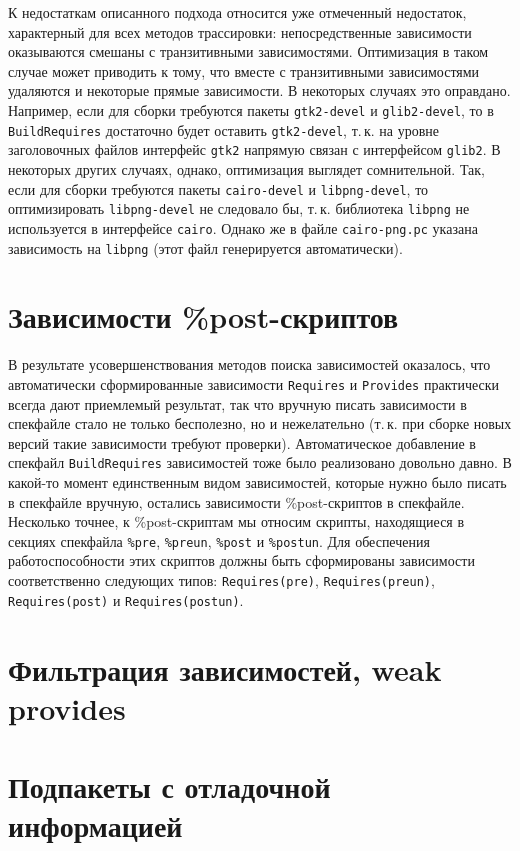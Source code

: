 \documentclass[russian,a4paper,12pt,titlepage]{article}
\begin{document}
К недостаткам описанного подхода относится уже отмеченный недостаток, характерный для всех методов трассировки:
непосредственные зависимости оказываются смешаны с транзитивными зависимостями.  Оптимизация в таком случае
может приводить к тому, что вместе с транзитивными зависимостями удаляются и некоторые прямые зависимости.
В некоторых случаях это оправдано.  Например, если для сборки требуются пакеты \verb|gtk2-devel| и
\verb|glib2-devel|, то в \verb|BuildRequires| достаточно будет оставить \verb|gtk2-devel|, т.\,к. на уровне
заголовочных файлов интерфейс \verb|gtk2| напрямую связан с интерфейсом \verb|glib2|.  В некоторых других случаях,
однако, оптимизация выглядет сомнительной.  Так, если для сборки требуются пакеты \verb|cairo-devel| и \verb|libpng-devel|,
то оптимизировать \verb|libpng-devel| не следовало бы, т.\,к. библиотека \verb|libpng| не используется в интерфейсе \verb|cairo|.
Однако же в файле \verb|cairo-png.pc| указана зависимость на \verb|libpng| (этот файл генерируется автоматически).

\section{Зависимости \%post-скриптов}
\label{post-script-deps}
В результате усовершенствования методов поиска зависимостей оказалось, что автоматически сформированные
зависимости \verb|Requires| и \verb|Provides| практически всегда дают приемлемый результат, так что вручную
писать зависимости в спекфайле стало не только бесполезно, но и нежелательно (т.\,к. при сборке новых версий
такие зависимости требуют проверки).  Автоматическое добавление в спекфайл \verb|BuildRequires| зависимостей
тоже было реализовано довольно давно.  В какой-то момент единственным видом зависимостей, которые нужно было
писать в спекфайле вручную, остались зависимости \%post-скриптов в спекфайле.  Несколько точнее, к \%post-скриптам
мы относим скрипты, находящиеся в секциях спекфайла \verb|%pre|, \verb|%preun|, \verb|%post| и \verb|%postun|.
Для обеспечения работоспособности этих скриптов должны быть сформированы зависимости соответственно следующих
типов: \verb|Requires(pre)|, \verb|Requires(preun)|, \verb|Requires(post)| и \verb|Requires(postun)|.

\section{Фильтрация зависимостей, weak provides}
\label{filter-deps}

\section{Подпакеты с отладочной информацией}
\end{document}
